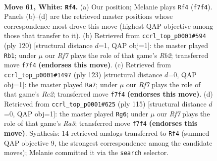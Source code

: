 \documentclass[11pt]{article}
\begin{document}
\clearpage

\begin{figure}[p]\centering
\begin{subfigure}{0.46\textwidth}\centering
\resizebox{\linewidth}{!}{%
\newchessgame
\chessboard[
  setfen={3k4/5R2/2r5/8/8/8/6K1/8 w - - 2 61},
  showmover=false,
  pgfstyle=straightmove, color=movearrow, markmove={f7-f4}
]}
\caption{}
\end{subfigure}\hfill
\begin{subfigure}{0.46\textwidth}\centering
\resizebox{\linewidth}{!}{%
\newchessgame
\chessboard[
  setfen={8/2k5/4K3/r7/8/8/1R6/8 w - - 2 61},
  showmover=false,
  pgfstyle=straightmove, color=movearrow, markmove={b2-b1}
]}
\caption{}
\end{subfigure}
\\[4pt]
\begin{subfigure}{0.46\textwidth}\centering
\resizebox{\linewidth}{!}{%
\newchessgame
\chessboard[
  setfen={8/2r5/1R6/8/6k1/8/3K4/8 b - - 4 62},
  showmover=false,
  pgfstyle=straightmove, color=movearrow, markmove={c7-a7}
]}
\caption{}
\end{subfigure}\hfill
\begin{subfigure}{0.46\textwidth}\centering
\resizebox{\linewidth}{!}{%
\newchessgame
\chessboard[
  setfen={2k5/8/r7/7R/8/8/8/1K6 b - - 17 58},
  showmover=false,
  pgfstyle=straightmove, color=movearrow, markmove={a6-g6}
]}
\caption{}
\end{subfigure}
\caption{\textbf{Move 61, White: \texttt{Rf4}.} (a) Our position; Melanie plays \texttt{Rf4} (\texttt{f7f4}). Panels (b)--(d) are the retrieved master positions whose correspondence most drove this move (highest QAP objective among those that transfer to it). (b) Retrieved from \texttt{ccrl\_top\_p0001\#594} (ply 120) [structural distance $d$=1, QAP obj=1]: the master played \texttt{Rb1}; under $\mu$ our \emph{Rf7} plays the role of that game's \emph{Rb2}; transferred move \texttt{f7f4} \textbf{(endorses this move)}. (c) Retrieved from \texttt{ccrl\_top\_p0001\#1497} (ply 123) [structural distance $d$=0, QAP obj=1]: the master played \texttt{Ra7}; under $\mu$ our \emph{Rf7} plays the role of that game's \emph{Rc2}; transferred move \texttt{f7f4} \textbf{(endorses this move)}. (d) Retrieved from \texttt{ccrl\_top\_p0001\#625} (ply 115) [structural distance $d$=0, QAP obj=1]: the master played \texttt{Rg6}; under $\mu$ our \emph{Rf7} plays the role of that game's \emph{Ra3}; transferred move \texttt{f7f4} \textbf{(endorses this move)}. Synthesis: 14 retrieved analogs transferred to \texttt{Rf4} (summed QAP objective 9, the strongest correspondence among the candidate moves); Melanie committed it via the \texttt{search} selector.}
\label{fig:thought-m120}
\end{figure}
\end{document}
